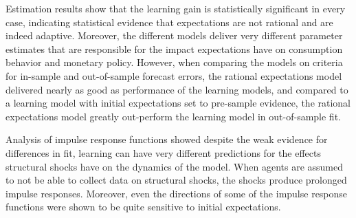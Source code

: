 Estimation results show that the learning gain is statistically significant in every case, indicating statistical evidence that expectations are not rational and are indeed adaptive.  Moreover, the different models deliver very different parameter estimates that are responsible for the impact expectations have on consumption behavior and monetary policy.  However, when comparing the models on criteria for in-sample and out-of-sample forecast errors, the rational expectations model delivered nearly as good as performance of the learning models, and compared to a learning model with initial expectations set to pre-sample evidence, the rational expectations model greatly out-perform the learning model in out-of-sample fit.

Analysis of impulse response functions showed despite the weak evidence for differences in fit, learning can have very different predictions for the effects structural shocks have on the dynamics of the model.  When agents are assumed to not be able to collect data on structural shocks, the shocks produce prolonged impulse responses.  Moreover, even the directions of some of the impulse response functions were shown to be quite sensitive to initial expectations.
